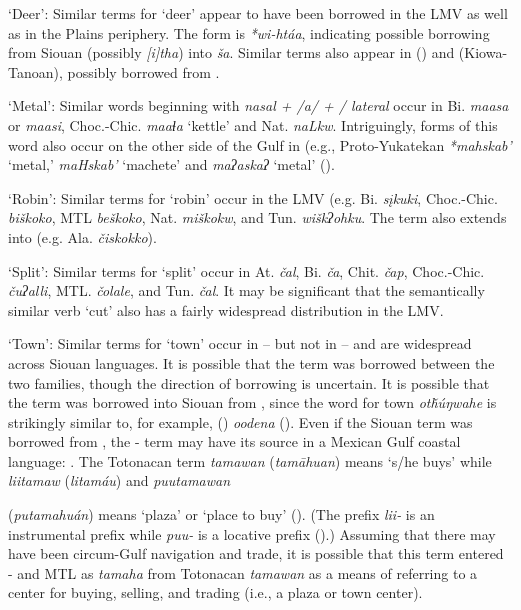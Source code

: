 \documentclass[output=paper]{LSP/langsci}
\begin{document}
\ea  \parbox[t]{.9\textwidth}{`Deer': Similar terms for `deer' appear to have been borrowed in the LMV as well as in the Plains periphery. The  form is \emph{*wi-htáa}, indicating possible borrowing from Siouan (possibly  \emph{[i]tha}) into  \emph{ša}. Similar terms also appear in  () and  (Kiowa-Tanoan), possibly borrowed from . }
\z

\ea \parbox[t]{.9\textwidth} {`Metal': Similar words beginning with \emph{nasal + /a/ +  / lateral} occur in Bi. \emph{maasa} or \emph{maasi}, Choc.-Chic. \emph{maaɬa} `kettle' and Nat. \emph{naLkw}. Intriguingly, forms of this word also occur on the other side of the Gulf in  (e.g., Proto-Yukatekan \emph{*mahskab’} `metal,'  \emph{maHskab’} `machete' and  \emph{maʔaskaʔ} `metal' (\citealt[208]{KaufmanJusteson2003}).}
\z

\ea  \parbox[t]{.9\textwidth}{`Robin': Similar terms for `robin' occur in the LMV (e.g. Bi. \emph{sįkuki}, Choc.-Chic. \emph{biškoko}, MTL \emph{beškoko}, Nat. \emph{miškokw}, and Tun. \emph{wiškʔohku}. The term also extends into  (e.g. Ala. \emph{čiskokko}).}
\z

\ea \parbox[t]{.9\textwidth} {`Split': Similar terms for `split' occur in At. \emph{čal}, Bi. \emph{ča}, Chit. \emph{čap}, Choc.-Chic. \emph{čuʔalli}, MTL. \emph{čolale}, and Tun. \emph{čal}. It may be significant that the semantically similar verb `cut' also has a fairly widespread distribution in the LMV.}
\z

\ea  \parbox[t]{.9\textwidth}{`Town': Similar terms for `town' occur in  -- but not in  -- and are widespread across Siouan languages. It is possible that the term was borrowed between the two families, though the direction of borrowing is uncertain. It is possible that the term was borrowed into Siouan from , since the  word for town \emph{otȟúŋwahe} is strikingly similar to, for example,  () \emph{oodena} (\citealt[272]{NicholsNyholm1995}). Even if the Siouan term was borrowed
from , the - term may have its source in a 
Mexican Gulf coastal language: . The Totonacan term \emph{tamawan} (\emph{tamāhuan}) means `s/he buys' while \emph{liitamaw} (\emph{litamáu}) and \emph{puutamawan} 
}
\parbox[t]{.9\textwidth}{
(\emph{putamahuán}) 
means `plaza' or `place to buy' (\citealt[110]{Aschmann1973}). (The  prefix \emph{lii-} is an instrumental prefix while \emph{puu-} is a locative prefix (\citealt[386,388]{MacKay1999}).) Assuming that there may have been circum-Gulf navigation and trade, it is possible that this term entered - and MTL as \emph{tamaha} from Totonacan \emph{tamawan} as a means of referring to a center for buying, selling, and trading (i.e., a plaza or town center).}
\z
\end{document}

